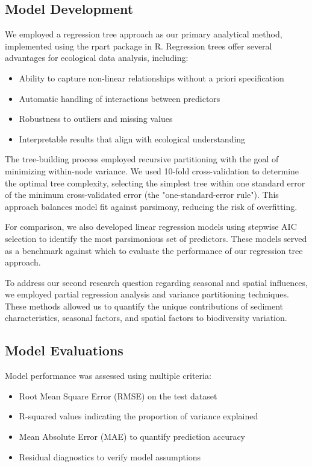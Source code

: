 \documentclass[12pt]{article}
\begin{document}
\subsection{Model Development}

\qquad We employed a regression tree approach as our primary analytical method, implemented using the rpart package in R. Regression trees offer several advantages for ecological data analysis, including:

\begin{itemize}
    \item Ability to capture non-linear relationships without a priori specification
    \item Automatic handling of interactions between predictors
    \item Robustness to outliers and missing values
    \item Interpretable results that align with ecological understanding
\end{itemize}

\qquad The tree-building process employed recursive partitioning with the goal of minimizing within-node variance. We used 10-fold cross-validation to determine the optimal tree complexity, selecting the simplest tree within one standard error of the minimum cross-validated error (the "one-standard-error rule"). This approach balances model fit against parsimony, reducing the risk of overfitting.

\qquad For comparison, we also developed linear regression models using stepwise AIC selection to identify the most parsimonious set of predictors. These models served as a benchmark against which to evaluate the performance of our regression tree approach.

\qquad To address our second research question regarding seasonal and spatial influences, we employed partial regression analysis and variance partitioning techniques. These methods allowed us to quantify the unique contributions of sediment characteristics, seasonal factors, and spatial factors to biodiversity variation.

\subsection{Model Evaluations}

\qquad Model performance was assessed using multiple criteria:

\begin{itemize}
    \item Root Mean Square Error (RMSE) on the test dataset
    \item R-squared values indicating the proportion of variance explained
    \item Mean Absolute Error (MAE) to quantify prediction accuracy
    \item Residual diagnostics to verify model assumptions
\end{itemize}
\end{document}
